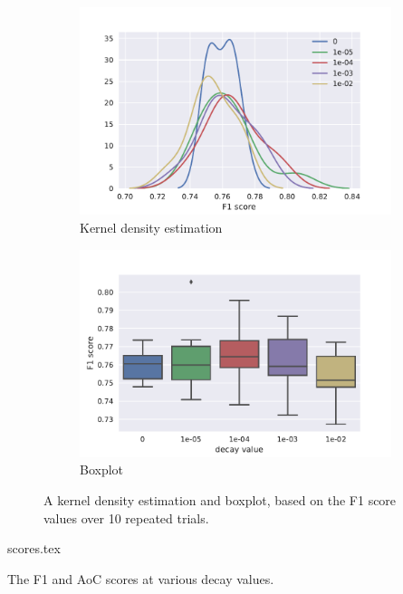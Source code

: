 \begin{figure}[htbp]
  \centering
  \begin{subfigure}[t]{0.49\textwidth}
    \centering
    \includegraphics[width=\textwidth]{./figures/results/decay/kde_f1.pdf}
    \caption{Kernel density estimation}%
    \label{fig:decay_kde}
  \end{subfigure}
  \begin{subfigure}[t]{0.49\textwidth}
    \centering
    \includegraphics[width=\textwidth]{./figures/results/decay/boxplot_f1.pdf}
    \caption{Boxplot}%
    \label{fig:decay_box}
  \end{subfigure}
  \caption{A kernel density estimation and boxplot, based on the F1 score values
  over 10 repeated trials.}%
  \label{fig:decay_dists}
\end{figure}

\begin{table}[htb]
  \centering
  {scores.tex}
  \caption{The F1 and AoC scores at various decay values.}%
  \label{tbl:decay}
\end{table}

